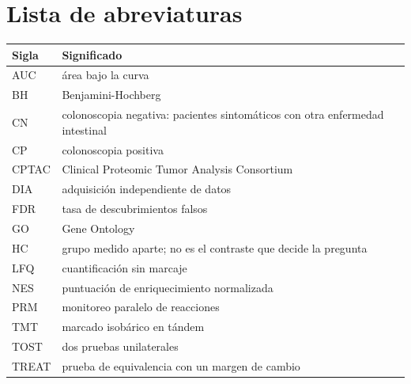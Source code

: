 \tableofcontents
\cleardoublepage
\listoftables
\cleardoublepage
\listoffigures
\cleardoublepage

\chapter*{Lista de abreviaturas}
\begin{longtable}{@{}p{2.4cm}p{11.5cm}@{}}
\toprule
Sigla & Significado \\
\midrule
\endhead
AUC & área bajo la curva \\
BH & Benjamini-Hochberg \\
CN & colonoscopia negativa: pacientes sintomáticos con otra enfermedad intestinal \\
CP & colonoscopia positiva \\
CPTAC & Clinical Proteomic Tumor Analysis Consortium \\
DIA & adquisición independiente de datos \\
FDR & tasa de descubrimientos falsos \\
GO & Gene Ontology \\
HC & grupo medido aparte; no es el contraste que decide la pregunta \\
LFQ & cuantificación sin marcaje \\
NES & puntuación de enriquecimiento normalizada \\
PRM & monitoreo paralelo de reacciones \\
TMT & marcado isobárico en tándem \\
TOST & dos pruebas unilaterales \\
TREAT & prueba de equivalencia con un margen de cambio \\
\bottomrule
\end{longtable}
\clearpage
